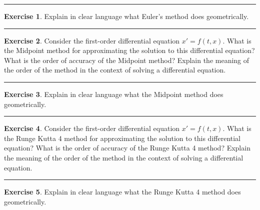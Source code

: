 \documentclass[
]{book}
\theoremstyle{definition}
\theoremstyle{definition}
\theoremstyle{definition}
\newtheorem{exercise}{Exercise}[chapter]
\theoremstyle{remark}
\begin{document}
\begin{center}\rule{0.5\linewidth}{0.5pt}\end{center}

\begin{exercise}
\protect\hypertarget{exr:unnamed-chunk-489}{}{\label{exr:unnamed-chunk-489} }Explain in clear language what Euler's method does geometrically.
\end{exercise}

\begin{center}\rule{0.5\linewidth}{0.5pt}\end{center}

\begin{exercise}
\protect\hypertarget{exr:unnamed-chunk-490}{}{\label{exr:unnamed-chunk-490} }Consider the first-order differential equation \(x' = f(t,x)\). What is
the Midpoint method for approximating the solution to this differential
equation? What is the order of accuracy of the Midpoint method? Explain
the meaning of the order of the method in the context of solving a
differential equation.
\end{exercise}

\begin{center}\rule{0.5\linewidth}{0.5pt}\end{center}

\begin{exercise}
\protect\hypertarget{exr:unnamed-chunk-491}{}{\label{exr:unnamed-chunk-491} }Explain in clear language what the Midpoint method does geometrically.
\end{exercise}

\begin{center}\rule{0.5\linewidth}{0.5pt}\end{center}

\begin{exercise}
\protect\hypertarget{exr:unnamed-chunk-492}{}{\label{exr:unnamed-chunk-492} }Consider the first-order differential equation \(x' = f(t,x)\). What is
the Runge Kutta 4 method for approximating the solution to this
differential equation? What is the order of accuracy of the Runge Kutta 4
method? Explain the meaning of the order of the method in the context of
solving a differential equation.
\end{exercise}

\begin{center}\rule{0.5\linewidth}{0.5pt}\end{center}

\begin{exercise}
\protect\hypertarget{exr:unnamed-chunk-493}{}{\label{exr:unnamed-chunk-493} }Explain in clear language what the Runge Kutta 4 method does
geometrically.
\end{exercise}
\end{document}
